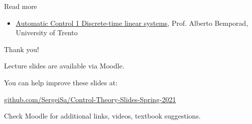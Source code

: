 \documentclass{beamer}
\begin{document}
\begin{frame}{Read more}

\begin{itemize}
\item  \href{http://cse.lab.imtlucca.it/~bemporad/teaching/ac/pdf/04a-TD_sys.pdf}{Automatic Control 1 Discrete-time linear systems}, Prof. Alberto Bemporad, University of Trento


\end{itemize}

\end{frame}



\begin{frame}{Thank you!}
\centerline{Lecture slides are available via Moodle.}
\bigskip
\centerline{You can help improve these slides at:}
\centerline{\href{https://github.com/SergeiSa/Control-Theory-Slides-Spring-2021}{github.com/SergeiSa/Control-Theory-Slides-Spring-2021}}
\bigskip
\centerline{Check Moodle for additional links, videos, textbook suggestions.}
\end{frame}
\end{document}
